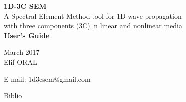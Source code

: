 \documentclass[letterpaper,11pt,titlepage,final]{report}
\def\MonthYear{March 2017}
\begin{document}
\parindent 0pt
\parskip 10pt


\thispagestyle{empty}
\vspace*{\fill}
\begin{center}


\vspace*{1mm}
{\Huge\bf{ 1D-3C SEM}}\\[5mm]
{\Large A Spectral Element Method tool for 1D wave propagation }\\
{\Large with three components (3C) in linear and nonlinear media}\\[2mm] 
{\Large \bf{User's Guide}}


\vspace*{3cm}
\fdunB
\MonthYear \\[3cm]
Elif ORAL\\[2mm]
{\small

E-mail: 1d3csem@gmail.com \\
}
\end{center}
\vfill
\thispagestyle{empty}
\hspace*{0pt}
\newpage
\thispagestyle{empty}
\vspace*{\fill}


\newpage
{\parskip 0pt
  \tableofcontents
}
\newpage








 {Biblio}
\end{document}
